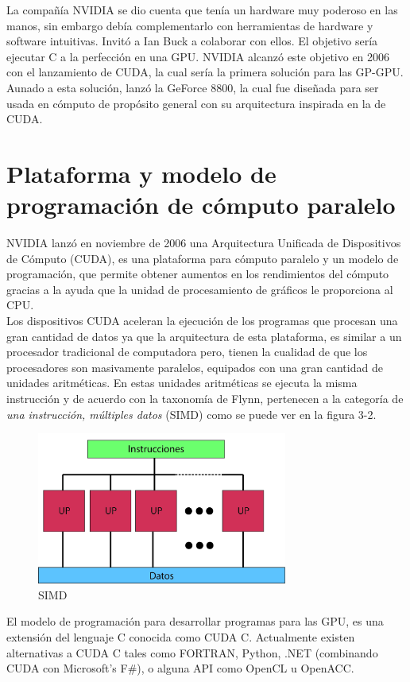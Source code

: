 La compañía NVIDIA se dio cuenta que tenía un hardware muy poderoso en las manos, sin embargo debía complementarlo con herramientas de hardware y software intuitivas. Invitó a Ian Buck a colaborar con ellos. El objetivo sería ejecutar C a la perfección en una GPU. NVIDIA alcanzó este objetivo en 2006 con el lanzamiento de CUDA, la cual sería la primera solución para las GP-GPU. Aunado a esta solución, lanzó la GeForce 8800, la cual fue diseñada para ser usada en cómputo de propósito general con su arquitectura inspirada en la de CUDA.
\section{Plataforma y modelo de programación de cómputo paralelo}
NVIDIA lanzó en noviembre de 2006 una Arquitectura Unificada de Dispositivos de Cómputo (CUDA), es una plataforma para cómputo paralelo y un modelo de programación, que permite obtener aumentos en los rendimientos del cómputo gracias a la ayuda que la unidad de procesamiento de gráficos le proporciona al CPU. \\
Los dispositivos CUDA aceleran la ejecución de los programas que procesan una gran cantidad de datos ya que la arquitectura de esta plataforma, es similar a un procesador tradicional de computadora pero, tienen la cualidad de que los procesadores son masivamente paralelos, equipados con una gran cantidad de unidades aritméticas. En estas unidades aritméticas se ejecuta la misma instrucción y de acuerdo con la taxonomía de Flynn, pertenecen a la categoría de \textit{una instrucción, múltiples datos} (SIMD) como se puede ver en la figura 3-2.\\ 
\begin{figure}[H]
                      \centering
                              \includegraphics[height=5cm]{img/SIMD.jpg}
                      \caption{SIMD}
\end{figure}
El modelo de programación para desarrollar programas para las GPU, es una extensión del lenguaje C conocida como CUDA C. Actualmente existen alternativas a CUDA C tales como FORTRAN, Python, .NET (combinando CUDA con Microsoft's F\#), o alguna API como OpenCL u OpenACC\cite{lenguajes}. 
